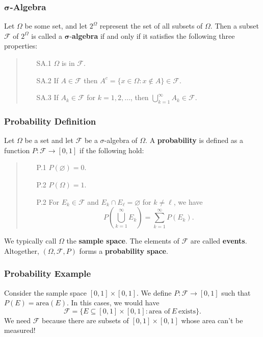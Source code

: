 \documentclass{beamer}
\begin{document}
\begin{frame}
\frametitle{$\boldsymbol\sigma$-Algebra}
\begin{Definition}
Let $\Omega$ be some set, and let $2^\Omega$ represent the set of all subsets of $\Omega$. Then a subset $\mathcal{F}$ of $2^\Omega$ is called a $\boldsymbol\sigma$-{\bf algebra} if and only if it satisfies the following three properties:
\medskip

\begin{quote}
\begin{enumerate}
\item[SA.1] $\Omega$ is in $\mathcal{F}$.
\item[SA.2] If $A\in \mathcal{F}$ then $A^c = \{x\in\Omega: x\not\in A\}  \in\mathcal{F}$.
\item[SA.3] If $A_k\in\mathcal{F}$ for $k = 1, 2,\ldots$, then $\displaystyle\bigcup_{k= 1}^\infty A_k\in\mathcal{F}$.
\end{enumerate}
\end{quote}
\end{Definition}
\end{frame}

\begin{frame}
\frametitle{Probability Definition}
\begin{Definition}
Let $\Omega$ be a set and let $\mathcal{F}$  be a $\sigma$-algebra of $\Omega$. A {\bf probability} is defined as a function $P:\mathcal{F}\to [0, 1]$ if the following hold:
\medskip

\begin{quote}
\begin{enumerate}
\item[P.1] $P(\varnothing) = 0$.
\item[P.2] $P(\Omega) = 1$.
\item[P.2] For $E_k \in\mathcal{F}$ and $E_k\cap E_\ell= \varnothing$ for $k\neq \ell$, we have
$$
P\left(\bigcup_{k = 1}^\infty E_k\right) = \sum_{k = 1}^\infty P(E_k).
$$
\end{enumerate}
\end{quote}
We typically call $\Omega$ the {\bf sample space}. The elements of $\mathcal{F}$ are called {\bf events}. Altogether, $(\Omega, \mathcal{F}, P)$ forms a {\bf probability space}.
\end{Definition}
\end{frame}

\begin{frame}[t]
\frametitle{Probability Example}
\begin{Example}
Consider the sample space $[0, 1]\times [0, 1]$. We define $P:\mathcal{F}\to [0, 1]$ such that $P(E) = \text{area}(E)$. In this cases, we would have 
$$
\mathcal{F} = \{E \subseteq [0, 1]\times [0, 1]: \text{area of}\ E\ \text{exists}\}.
$$
We need $\mathcal{F}$ because there are subsets of $[0, 1]\times [0, 1]$ whose area can't be measured!
\end{Example}
\end{frame}
\end{document}
